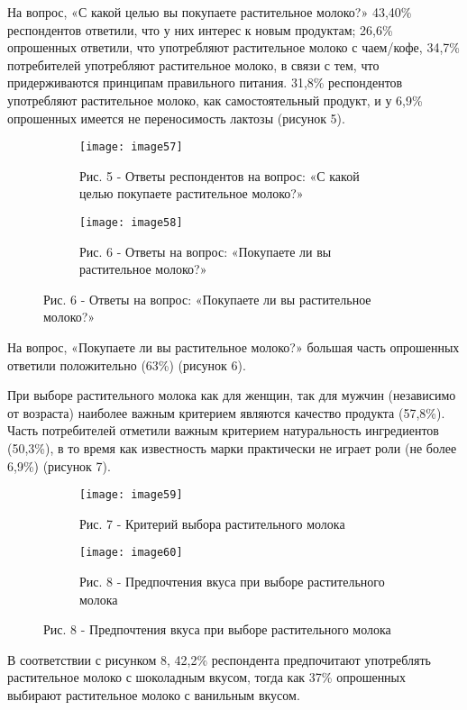 На вопрос, «С какой целью вы покупаете растительное молоко?» 43,40\%
респондентов ответили, что у них интерес к новым продуктам; 26,6\%
опрошенных ответили, что употребляют растительное молоко с чаем/кофе,
34,7\% потребителей употребляют растительное молоко, в связи с тем, что
придерживаются принципам правильного питания. 31,8\% респондентов
употребляют растительное молоко, как самостоятельный продукт, и у 6,9\%
опрошенных имеется не переносимость лактозы (рисунок 5).

\begin{figure}[htbp]
\begin{subfigure}[b]{0.45\textwidth}
\centering
\texttt{[image: image57]}
\caption*{Рис. 5 - Ответы респондентов на вопрос: «С какой целью покупаете растительное молоко?»}
\end{subfigure}
\hspace{0.05\textwidth}
\begin{subfigure}[b]{0.45\textwidth}
\centering
\texttt{[image: image58]}
\caption*{Рис. 6 - Ответы на вопрос: «Покупаете ли вы растительное молоко?»}
\end{subfigure}
\end{figure}

На вопрос, «Покупаете ли вы растительное молоко?» большая часть
опрошенных ответили положительно (63\%) (рисунок 6).

При выборе растительного молока как для женщин, так для мужчин
(независимо от возраста) наиболее важным критерием являются качество
продукта (57,8\%). Часть потребителей отметили важным критерием
натуральность ингредиентов (50,3\%), в то время как известность марки
практически не играет роли (не более 6,9\%) (рисунок 7).

\begin{figure}[htbp]
\begin{subfigure}[b]{0.45\textwidth}
\centering
\texttt{[image: image59]}
\caption*{Рис. 7 - Критерий выбора растительного молока}
\end{subfigure}
\hspace{0.05\textwidth}
\begin{subfigure}[b]{0.45\textwidth}
\centering
\texttt{[image: image60]}
\caption*{Рис. 8 - Предпочтения вкуса при выборе растительного молока}
\end{subfigure}
\end{figure}

В соответствии с рисунком 8, 42,2\% респондента предпочитают употреблять
растительное молоко с шоколадным вкусом, тогда как 37\% опрошенных
выбирают растительное молоко с ванильным вкусом.


